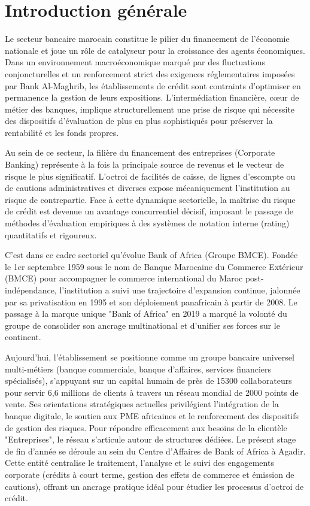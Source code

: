 \cleardoublepage
\chapter*{Introduction générale}

Le secteur bancaire marocain constitue le pilier du financement de l’économie nationale et joue un rôle de catalyseur pour la croissance des agents économiques. Dans un environnement macroéconomique marqué par des fluctuations conjoncturelles et un renforcement strict des exigences réglementaires imposées par Bank Al-Maghrib, les établissements de crédit sont contraints d'optimiser en permanence la gestion de leurs expositions. L'intermédiation financière, cœur de métier des banques, implique structurellement une prise de risque qui nécessite des dispositifs d'évaluation de plus en plus sophistiqués pour préserver la rentabilité et les fonds propres.

Au sein de ce secteur, la filière du financement des entreprises (Corporate Banking) représente à la fois la principale source de revenus et le vecteur de risque le plus significatif. L'octroi de facilités de caisse, de lignes d'escompte ou de cautions administratives et diverses expose mécaniquement l'institution au risque de contrepartie. Face à cette dynamique sectorielle, la maîtrise du risque de crédit est devenue un avantage concurrentiel décisif, imposant le passage de méthodes d'évaluation empiriques à des systèmes de notation interne (rating) quantitatifs et rigoureux.

C’est dans ce cadre sectoriel qu'évolue Bank of Africa (Groupe BMCE). Fondée le 1er septembre 1959 sous le nom de Banque Marocaine du Commerce Extérieur (BMCE) pour accompagner le commerce international du Maroc post-indépendance, l'institution a suivi une trajectoire d'expansion continue, jalonnée par sa privatisation en 1995 et son déploiement panafricain à partir de 2008. Le passage à la marque unique "Bank of Africa" en 2019 a marqué la volonté du groupe de consolider son ancrage multinational et d'unifier ses forces sur le continent.

Aujourd'hui, l'établissement se positionne comme un groupe bancaire universel multi-métiers (banque commerciale, banque d'affaires, services financiers spécialisés), s'appuyant sur un capital humain de près de 15300 collaborateurs pour servir 6,6 millions de clients à travers un réseau mondial de 2000 points de vente. Ses orientations stratégiques actuelles privilégient l'intégration de la banque digitale, le soutien aux PME africaines et le renforcement des dispositifs de gestion des risques. Pour répondre efficacement aux besoins de la clientèle "Entreprises", le réseau s'articule autour de structures dédiées. Le présent stage de fin d'année se déroule au sein du Centre d'Affaires de Bank of Africa à Agadir. Cette entité centralise le traitement, l'analyse et le suivi des engagements corporate (crédits à court terme, gestion des effets de commerce et émission de cautions), offrant un ancrage pratique idéal pour étudier les processus d'octroi de crédit.

